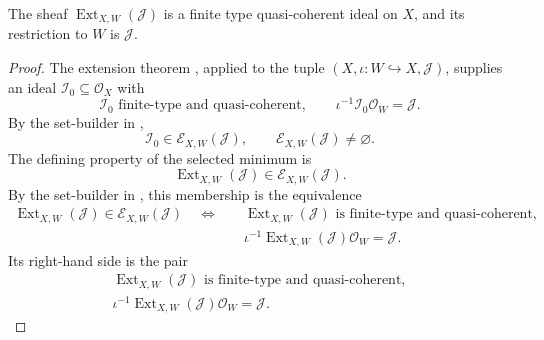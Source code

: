 \begin{lemma}
  \label{lemma:nagata-extend-finite-type-ideal}
  \lean{}

  The sheaf $\operatorname{Ext}_{X,W}(\mathcal J)$ is a finite type
  quasi-coherent ideal on $X$, and its restriction to $W$ is
  $\mathcal J$.
\end{lemma}

\begin{proof}
  The extension theorem
  {\cite[\href{https://stacks.math.columbia.edu/tag/01PF}{Tag 01PF}]
  {stacks-project}}, applied to the tuple
  $(X,\iota\colon W\hookrightarrow X,\mathcal J)$, supplies an ideal
  $\mathcal I_0\subseteq\mathcal O_X$ with
  \[
    \mathcal I_0\text{ finite-type and quasi-coherent},
    \qquad
    \iota^{-1}\mathcal I_0\mathcal O_W=\mathcal J.
  \]
  By the set-builder in
  ,
  \[
    \mathcal I_0\in\mathscr E_{X,W}(\mathcal J),
    \qquad
    \mathscr E_{X,W}(\mathcal J)\ne\varnothing.
  \]
  The defining property of the selected minimum is
  \[
    \operatorname{Ext}_{X,W}(\mathcal J)
      \in\mathscr E_{X,W}(\mathcal J).
  \]
  By the set-builder in
  , this membership is the
  equivalence
  \[
  \begin{aligned}
    \operatorname{Ext}_{X,W}(\mathcal J)
      \in\mathscr E_{X,W}(\mathcal J)
    \quad\Longleftrightarrow\quad
    &\operatorname{Ext}_{X,W}(\mathcal J)
       \text{ is finite-type and quasi-coherent},\\
    &\iota^{-1}\operatorname{Ext}_{X,W}(\mathcal J)
       \mathcal O_W=\mathcal J.
  \end{aligned}
  \]
  Its right-hand side is the pair
  \[
  \begin{gathered}
    \operatorname{Ext}_{X,W}(\mathcal J)
       \text{ is finite-type and quasi-coherent},\\
    \iota^{-1}\operatorname{Ext}_{X,W}(\mathcal J)
       \mathcal O_W=\mathcal J.
  \end{gathered}
  \]
\end{proof}

